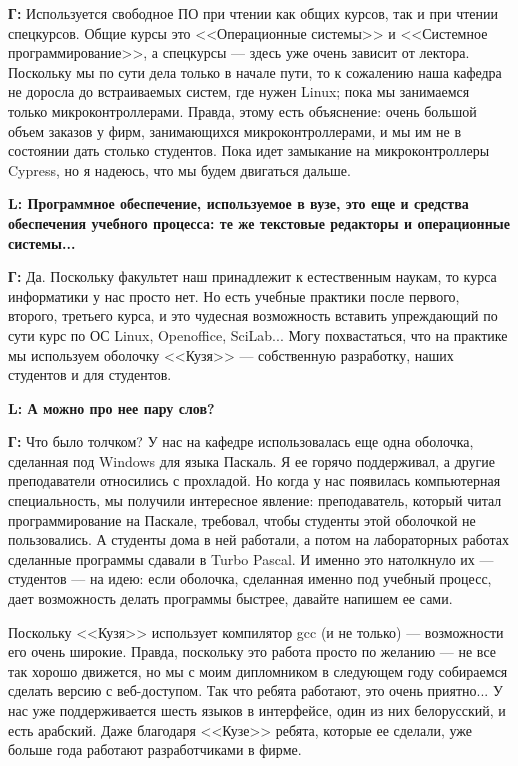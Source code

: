 \documentclass[10pt, a5paper]{article}
\begin{document}
{\noindent \bf Г:} Используется свободное ПО при чтении как общих курсов, так и при чтении спецкурсов. Общие курсы это <<Операционные системы>> и <<Системное программирование>>, а спецкурсы --- здесь уже очень зависит от лектора. Поскольку мы по сути дела только в начале пути, то к сожалению наша кафедра не доросла до встраиваемых систем, где нужен Linux; пока мы занимаемся только микроконтроллерами. Правда, этому есть объяснение: очень большой объем заказов у фирм, занимающихся микроконтроллерами, и мы им не в состоянии дать столько студентов. Пока идет замыкание на микроконтроллеры Cypress, но я надеюсь, что мы будем двигаться дальше.

{\noindent \bf L: Программное обеспечение, используемое в вузе, это еще и средства обеспечения учебного процесса: те же текстовые редакторы и операционные системы...}

{\noindent \bf Г:} Да. Поскольку факультет наш принадлежит к естественным наукам, то курса информатики у нас просто нет. Но есть учебные практики после первого, второго, третьего курса, и это чудесная возможность вставить упреждающий по сути курс по ОС Linux, Openoffice, SciLab... Могу похвастаться, что на практике мы используем оболочку <<Кузя>> --- собственную разработку, наших студентов и для студентов.

{\noindent \bf L: А можно про нее пару слов?}

{\noindent \bf Г:}  Что было толчком? У нас на кафедре использовалась еще одна оболочка, сделанная под Windows для языка Паскаль. Я ее горячо поддерживал, а другие преподаватели относились с прохладой. Но когда у нас появилась компьютерная специальность, мы получили интересное явление: преподаватель, который читал программирование на Паскале, требовал, чтобы студенты этой оболочкой не пользовались. А студенты дома в ней работали, а потом на лабораторных работах сделанные программы сдавали в Turbo Pascal. И именно это натолкнуло их --- студентов --- на идею: если оболочка, сделанная именно под учебный процесс, дает возможность делать программы быстрее, давайте напишем ее сами. 

Поскольку <<Кузя>> использует компилятор gcc (и не только) --- возможности его очень широкие. Правда, поскольку это работа просто по желанию --- не все так хорошо движется, но мы с моим дипломником в следующем году собираемся сделать версию с веб-доступом. Так что ребята работают, это очень приятно... У нас уже поддерживается шесть языков в интерфейсе, один из них белорусский, и есть арабский. Даже благодаря <<Кузе>> ребята, которые ее сделали, уже больше года работают разработчиками в фирме. 
\end{document}
